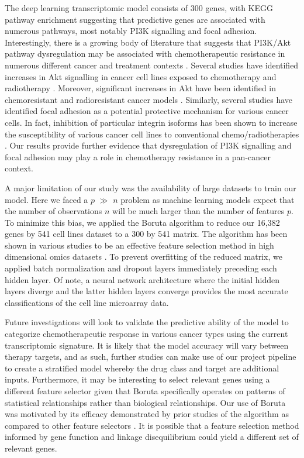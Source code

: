 \documentclass[10pt, letterpaper]{article}
\begin{document}
\begin{multicols*}{2}
The deep learning transcriptomic model consists of 300 genes, with KEGG pathway enrichment suggesting that predictive genes are associated with numerous pathways, most notably PI3K signalling and focal adhesion. Interestingly, there is a growing body of literature that suggests that PI3K/Akt pathway dysregulation may be associated with chemotherapeutic resistance in numerous different cancer and treatment contexts \cite{huang_2009}. Several studies have identified increases in Akt signalling in cancer cell lines exposed to chemotherapy and radiotherapy \cite{mapk, wort, phos}. Moreover, significant increases in Akt have been identified in chemoresistant and radioresistant cancer models \cite{cholangio}. Similarly, several studies have identified focal adhesion as a potential protective mechanism for various cancer cells. In fact, inhibition of particular integrin isoforms has been shown to increase the susceptibility of various cancer cell lines to conventional chemo/radiotherapies \cite{focal_adhesion}. Our results provide further evidence that dysregulation of PI3K signalling and focal adhesion may play a role in chemotherapy resistance in a pan-cancer context.

A major limitation of our study was the availability of large datasets to train our model. Here we faced a $p$ $\gg$ $n$ problem as machine learning models expect that the number of observations $n$ will be much larger than the number of features $p$. To minimize this bias, we applied the Boruta algorithm to reduce our 16,382 genes by 541 cell lines dataset to a 300 by 541 matrix. The algorithm has been shown in various studies to be an effective feature selection method in high dimensional omics datasets \cite{boruta}. To prevent overfitting of the reduced matrix, we applied batch normalization and dropout layers immediately preceding each hidden layer. Of note, a neural network architecture where the initial hidden layers diverge and the latter hidden layers converge provides the most accurate classifications of the cell line microarray data.

Future investigations will look to validate the predictive ability of the model to categorize chemotherapeutic response in various cancer types using the current transcriptomic signature. It is likely that the model accuracy will vary between therapy targets, and as such, further studies can make use of our project pipeline to create a stratified model whereby the drug class and target are additional inputs. Furthermore, it may be interesting to select relevant genes using a different feature selector given that Boruta specifically operates on patterns of statistical relationships rather than biological relationships. Our use of Boruta was motivated by its efficacy demonstrated by prior studies of the algorithm as compared to other feature selectors \cite{boruta, deep_cell}. It is possible that a feature selection method informed by gene function and linkage disequilibrium could yield a different set of relevant genes.



\end{multicols*}
\end{document}

